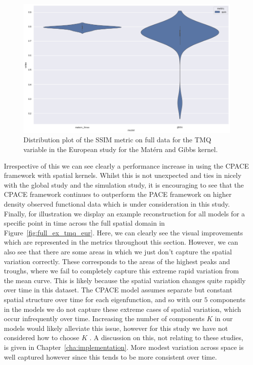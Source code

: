 \begin{figure}
	\centering
	\includegraphics[width=\textwidth]{full_tmq_eur_dist}
	\caption[Distribution plot of the SSIM metric on full data for the TMQ variable in the European study for the Mat\'ern and Gibbs kernel.]{Distribution plot of the SSIM metric on full data for the TMQ variable in the European study for the Mat\'ern and Gibbs kernel.}
	\label{fig:full_tmq_eur_dist}
\end{figure}

Irrespective of this we can see clearly a performance increase in using the CPACE framework with spatial kernels.
Whilst this is not unexpected and ties in nicely with the global study and the simulation study, it is encouraging to see that the CPACE framework continues to outperform the PACE framework on  higher density observed functional data which is under consideration in this study.
Finally, for illustration we display an example reconstruction for all models for a specific point in time across the full spatial domain in Figure~\ref{fig:full_ex_tmq_eur}.
Here, we can clearly see the visual  improvements which are represented in the metrics throughout this section.
However, we can also see that there are some areas in which we just don't capture the spatial variation correctly.
These corresponds to the areas of the highest peaks  and troughs, where we fail to completely capture this extreme rapid variation from the mean curve.
This is likely because the spatial variation changes quite rapidly over time in this dataset.
The CPACE model assumes separate but constant spatial structure over time for each eigenfunction, and so with our $5$ components in the models we do not capture these extreme cases of spatial variation, which occur infrequently over time.
Increasing the number of components $K$ in our models would likely alleviate this issue, however for this study we have not considered how to choose $K$ .
A discussion on this, not relating to these studies, is given in Chapter~\ref{cha:implementation}.
More modest variation across space is well captured however since this tends to be more consistent over time.

